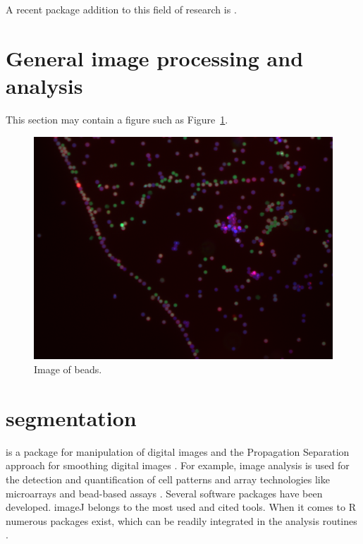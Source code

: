 A recent package addition to this field of research is  \citep{barthelme_imager:_2016}.



\section{General image processing and analysis}

This section may contain a figure such as Figure~\ref{figure:bead}.

\begin{figure}[htbp]
  \centering
  \includegraphics[clip=true,trim=0.1cm 0.3cm 0.2cm 0.1cm, width=12cm]{bead}
  \caption{Image of beads.}
  \label{figure:bead}
\end{figure}

\section{segmentation}

\citep{holmes_interactive_2009}

 is a package for manipulation of digital images and the 
Propagation Separation approach for smoothing digital images \citep{polzehl_adaptive_2007}.
For example, image analysis is used for the detection and quantification of 
cell patterns and array technologies like microarrays and bead-based assays 
\citep{dunning_beadarray:_2006, rodiger_highly_2013, willitzki_new_2012, willitzki_fully_2013}.
Several software packages have been developed. imageJ belongs to the most 
used and cited tools. When it comes to R numerous packages exist, which can 
be readily integrated in the analysis routines \citep{frery_introduction_2013}.

